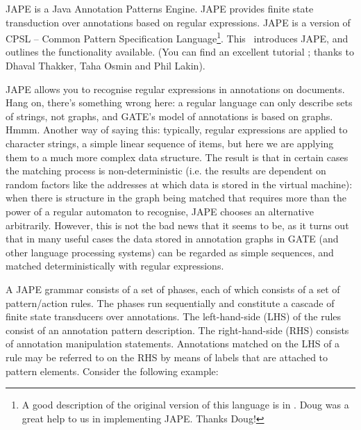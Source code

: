%
%
%
%
\nnormalsize
JAPE is a Java Annotation Patterns Engine.  JAPE provides finite state
transduction over annotations based on regular expressions.  JAPE is a
version of CPSL -- Common Pattern Specification Language\footnote{A
good description of the original version of this language is in
.  Doug was a great help to us in implementing
JAPE. Thanks Doug!}. This \chapthing\ introduces JAPE, and outlines the
functionality available. (You can find an excellent tutorial
; thanks to Dhaval Thakker, Taha Osmin and Phil Lakin).

JAPE allows you to recognise regular expressions in annotations on documents.
Hang on, there's something wrong here: a regular language can only describe
sets of strings, not graphs, and GATE's model of annotations is based on
graphs. Hmmm. Another way of saying this: typically, regular expressions are
applied to character strings, a simple linear sequence of items,
but here we are applying them to a much more complex data structure. The
result is that in certain cases the matching process is non-deterministic
(i.e. the results are dependent on random factors like the addresses at which
data is stored in the virtual machine): when there is structure in the graph
being matched that requires more than the power of a regular automaton to
recognise, JAPE chooses an alternative arbitrarily. However, this is not the
bad news that it seems to be, as it turns out that in many useful cases the
data stored in annotation graphs in GATE (and other language processing
systems) can be regarded as simple sequences, and matched deterministically
with regular expressions.

A JAPE grammar consists of a set of phases, each of which consists of a set of
pattern/action rules. The phases run sequentially and constitute a cascade of
finite state transducers over annotations. The left-hand-side (LHS) of the rules
consist of an annotation pattern description. The right-hand-side (RHS) consists
of annotation manipulation statements. Annotations matched on the LHS of a rule may be
referred to on the RHS by means of labels that are attached to pattern
elements. Consider the following example:

